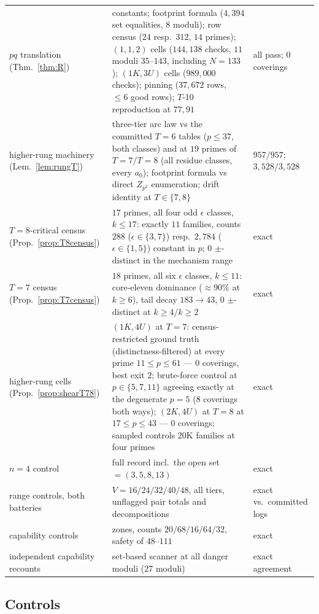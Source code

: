 \begin{longtable}{@{}p{3.7cm}>{\raggedright\arraybackslash}p{8.2cm}>{\raggedright\arraybackslash}p{3.1cm}@{}}
$pq$ translation (Thm.~\ref{thm:R}) & constants; footprint formula
  ($4{,}394$ set equalities, $8$ moduli); row census ($24$ resp.\ $312$,
  $14$ primes); $(1,1,2)$ cells ($144{,}138$ checks, $11$ moduli $35$--$143$,
  including $N=133$);
  $(1K,3U)$ cells ($989{,}000$ checks); pinning ($37{,}672$ rows,
  $\le6$ good rows); $T$-10 reproduction at $77,91$ &
  all pass; $0$ coverings \\
higher-rung machinery (Lem.~\ref{lem:rungT}) & three-tier arc law vs the
  committed $T=6$ tables ($p\le37$, both classes) and at $19$ primes of
  $T=7/T=8$ (all residue classes, every $a_0$); footprint formula vs
  direct $Z_{p^2}$ enumeration; drift identity at $T\in\{7,8\}$ &
  $957/957$; $3{,}528/3{,}528$ \\
$T=8$-critical census (Prop.~\ref{prop:T8census}) & $17$ primes, all four
  odd $\epsilon$ classes, $k\le17$: exactly $11$ families, counts
  $288$ ($\epsilon\in\{3,7\}$) resp.\ $2{,}784$ ($\epsilon\in\{1,5\}$)
  constant in $p$; $0$ $\pm$-distinct in the mechanism range & exact \\
$T=7$ census (Prop.~\ref{prop:T7census}) & $18$ primes, all six
  $\epsilon$ classes, $k\le11$: core-eleven dominance ($\approx90\%$ at
  $k\ge6$), tail decay $183\to43$, $0$ $\pm$-distinct at $k\ge4$/$k\ge2$ &
  exact \\
higher-rung cells (Prop.~\ref{prop:shearT78}) & $(1K,4U)$ at $T=7$:
  census-restricted ground truth (distinctness-filtered) at every prime
  $11\le p\le61$ --- $0$ coverings, best exit $2$; brute-force control at
  $p\in\{5,7,11\}$ agreeing exactly at the degenerate $p=5$ ($8$
  coverings both ways); $(2K,4U)$ at $T=8$ at $17\le p\le43$ --- $0$
  coverings; sampled controls $20$K families at four primes & exact \\
\midrule
$n=4$ control & full record incl.\ the open set $=(3,5,8,13)$ &
  exact \\
range controls, both batteries & $V=16/24/32/40/48$, all tiers, unflagged
  pair totals and decompositions & exact vs.\ committed logs \\
capability controls & zones, counts $20/68/16/64/32$, safety of
  $48$--$111$ & exact \\
independent capability recounts & set-based scanner at all danger moduli
  ($27$ moduli) & exact agreement \\
\end{longtable}
\endgroup

\subsection{Controls}


